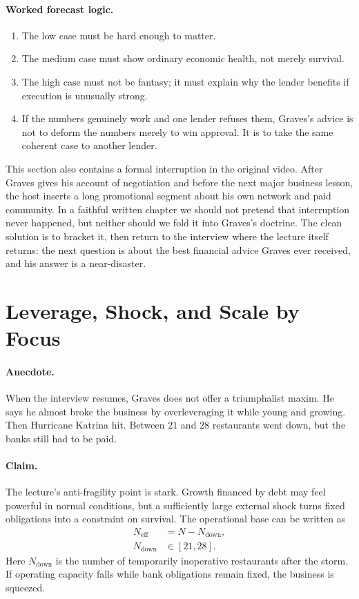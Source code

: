 \paragraph{Worked forecast logic.}
\begin{enumerate}
\item The low case must be hard enough to matter.
\item The medium case must show ordinary economic health, not merely survival.
\item The high case must not be fantasy; it must explain why the lender benefits if execution is unusually strong.
\item If the numbers genuinely work and one lender refuses them, Graves's advice is not to deform the numbers merely to win approval. It is to take the same coherent case to another lender.
\end{enumerate}

This section also contains a formal interruption in the original video. After Graves gives his account of negotiation and before the next major business lesson, the host inserts a long promotional segment about his own network and paid community. In a faithful written chapter we should not pretend that interruption never happened, but neither should we fold it into Graves's doctrine. The clean solution is to bracket it, then return to the interview where the lecture itself returns: the next question is about the best financial advice Graves ever received, and his answer is a near-disaster.

\section{Leverage, Shock, and Scale by Focus}

\paragraph{Anecdote.}
When the interview resumes, Graves does not offer a triumphalist maxim. He says he almost broke the business by overleveraging it while young and growing. Then Hurricane Katrina hit. Between \(21\) and \(28\) restaurants went down, but the banks still had to be paid.

\paragraph{Claim.}
The lecture's anti-fragility point is stark. Growth financed by debt may feel powerful in normal conditions, but a sufficiently large external shock turns fixed obligations into a constraint on survival. The operational base can be written as
\begin{align}
N_{\mathrm{eff}} &= N - N_{\mathrm{down}},\\
N_{\mathrm{down}} &\in [21,28].
\end{align}
Here \(N_{\mathrm{down}}\) is the number of temporarily inoperative restaurants after the storm. If operating capacity falls while bank obligations remain fixed, the business is squeezed.

